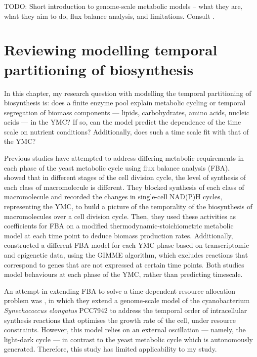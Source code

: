 TODO: Short introduction to genome-scale metabolic models -- what they are, what they aim to do, flux balance analysis, and limitations.  Consult \textcite{orthWhatFluxBalance2010}.

\section{Reviewing modelling temporal partitioning of biosynthesis}
\label{sec:model-temporal}

In this chapter, my research question with modelling the temporal partitioning of biosynthesis is:
does a finite enzyme pool explain metabolic cycling or temporal segregation of biomass components --- lipids, carbohydrates, amino acids, nucleic acids --- in the YMC?
If so, can the model predict the dependence of the time scale on nutrient conditions?
Additionally, does such a time scale fit with that of the YMC?

Previous studies have attempted to address differing metabolic requirements in each phase of the yeast metabolic cycle using flux balance analysis (FBA).
\textcite{takhaveevTemporalSegregationBiosynthetic2023} showed that in different stages of the cell division cycle, the level of synthesis of each class of macromolecule is different.
They blocked synthesis of each class of macromolecule and recorded the changes in single-cell NAD(P)H cycles, representing the YMC, to build a picture of the temporality of the biosynthesis of macromolecules over a cell division cycle.
Then, they used these activities as coefficients for FBA on a modified thermodynamic-stoichiometric metabolic model at each time point to deduce biomass production rates.
Additionally, \textcite{cesurGenomeWideAnalysisYeast} constructed a different FBA model for each YMC phase based on transcriptomic and epigenetic data, using the GIMME algorithm, which excludes reactions that correspond to genes that are not expressed at certain time points.
Both studies model behaviours at each phase of the YMC, rather than predicting timescale.

An attempt in extending FBA to solve a time-dependent resource allocation problem was \textcite{reimersCellularTradeoffsOptimal2017}, in which they extend a genome-scale model of the cyanobacterium \textit{Synechococcus elongatus} PCC7942 to address the temporal order of intracellular synthesis reactions that optimises the growth rate of the cell, under resource constraints.
However, this model relies on an external oscillation --- namely, the light-dark cycle --- in contrast to the yeast metabolic cycle which is autonomously generated.
Therefore, this study has limited applicability to my study.

